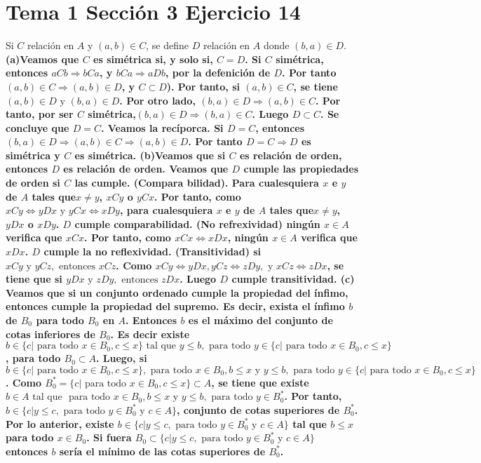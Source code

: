 \documentclass{article}
\begin{document}
\section{Tema 1 Sección 3 Ejercicio 14}
Si \(C\) relación en \(A\) y \((a,b)\in C\), se define \(D\) relación en \(A\) donde \((b,a)\in D\).
\newline
\bf (a)\rm Veamos que \(C\) es simétrica si, y solo si, \(C=D\). Si \(C\) simétrica, entonces \(aCb \Rightarrow bCa\), y  
\(bCa \Rightarrow aDb\), por la defenición de \(D\). Por tanto \((a,b)\in C \Rightarrow (a,b)\in D\), y \(C\subset D\)). Por tanto, si \((a,b)\in C\), se tiene \((a,b)\in D \text{ y } (b,a)\in D \). Por otro lado, \((b,a)\in D\Rightarrow (a,b)\in C\). Por tanto, por ser \(C\) simétrica,\((b,a)\in D\Rightarrow (b,a)\in C \). Luego \(D\subset C\). Se concluye que \(D=C\). Veamos la recíporca. Si \(D=C\), entonces \((b,a)\in D\Rightarrow (a,b)\in C\Rightarrow (a,b)\in D\). Por tanto \(D=C\Rightarrow D\) es simétrica y \(C\) es simétrica.
\newline
\bf (b)\rm Veamos que si \(C\) es relación de orden, entonces \(D\) es relación de orden. Veamos que \(D\) cumple las propiedades de orden si \(C\) las cumple. (Compara bilidad). Para cualesquiera \(x\) e \(y\) de \(A\) tales que\(x\neq y\), \(xCy\) o \(yCx\). Por tanto, como \(xCy\Leftrightarrow yDx \text{ y } yCx \Leftrightarrow xDy\), para cualesquiera \(x\) e \(y\) de \(A\) tales que\(x\neq y\), \(yDx\) o \(xDy\). \(D\) cumple comparabilidad. (No refrexividad) ningún \(x\in A\) verifica que \(xCx\). Por tanto, como \(xCx \Leftrightarrow xDx\), ningún \(x\in A\) verifica que \(xDx\). \(D\) cumple la no reflexividad. (Transitividad) si \(xCy \text{ y } yCz,\text{ entonces } xCz\). Como \(xCy \Leftrightarrow yDx, yCz \Leftrightarrow zDy,\text{ y } xCz\Leftrightarrow zDx\), se tiene que si \(yDx \text{ y } zDy,\text{ entonces } zDx\). Luego \(D\) cumple  transitividad. 
\newline
\bf (c) \rm Veamos que si un conjunto ordenado cumple la propiedad del ínfimo, entonces cumple la propiedad del supremo. Es decir, exista el ínfimo \(b\) de \(B_0\) para todo \(B_0\) en \(A\). Entonces \(b\) es el máximo del conjunto de cotas inferiores de \(B_0\). Es decir existe \(b\in\{c|\text{ para todo } x \in B_0, c \leq x\} \text{ tal que }y\leq b, \text{ para todo } y\in\{c|\text{ para todo } x \in B_0, c \leq x\}\), para todo \( B_0\subset A\). Luego, si \(b\in \{c|\text{ para todo } x \in B_0, c \leq x\},\text{ para todo } x \in B_0, b \leq x \text{ y }y\leq b, \text{ para todo } y\in\{c|\text{ para todo } x \in B_0, c\leq x\}\). Como \(B^*_0=\{c|\text{ para todo } x \in B_0, c \leq x\}\subset A\), se tiene que existe \(b\in A \text{ tal que } \text{ para todo } x \in B_0, b \leq x \text{ y }y\leq b, \text{ para todo } y\in B^*_0\). Por tanto,\(b\in \{c|y\leq c, \text{ para todo } y\in B^*_0 \text{ y } c\in A\}\), conjunto de cotas superiores de \(B^*_0\). Por lo anterior, existe \(b\in\{c|y\leq c, \text{ para todo } y\in B^*_0 \text{ y } c\in A\}\) tal que \(b\leq x\) para todo \(x\in B_0\). Si fuera \(B_0\subset\{c|y\leq c, \text{ para todo } y\in B^*_0 \text{ y } c\in A\}\) entonces \(b\) sería el mínimo de las cotas superiores de \(B^*_0\).
%
%
\end{document}
